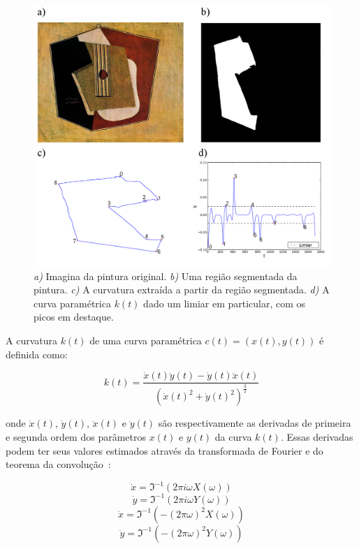 \begin{figure}[h!]
\begin{center}
        \includegraphics[width=\columnwidth]{figs/curvatura}
      \caption{\textit{a)} Imagina da pintura original. \textit{b)} Uma região
        segmentada da pintura. \textit{c)} A curvatura extraída a partir
        da região segmentada. \textit{d)} A curva paramétrica $k(t)$ dado um
        limiar em particular, com os picos em destaque.}
        \label{fig:curvatura}
\end{center}
\end{figure}

A curvatura $k(t)$ de uma curva paramétrica $c(t) = (x(t), y(t))$ é definida como:

\begin{equation}
k(t) = \frac{\dot{x}(t)\ddot{y}(t)-\dot{y}(t)\ddot{x}(t)} {(\dot{x}(t)^2+\dot{y}(t)^2)^\frac{3}{2}}
\label{eq:curvatura}
\end{equation}

\noindent onde $\dot{x}(t)$, $\dot{y}(t)$, $\ddot{x}(t)$ e
$\ddot{y}(t)$ são respectivamente as derivadas de primeira e segunda
ordem dos parâmetros $x(t)$ e $y(t)$ da curva $k(t)$. Essas derivadas
podem ter seus valores estimados através da transformada de Fourier e
do teorema da convolução~\cite{papoulis}:

\begin{equation}
\dot{x} = \Im^{-1}(2\pi i \omega X(\omega))
\end{equation}
\begin{equation}
\dot{y} = \Im^{-1}(2\pi i \omega Y(\omega))
\end{equation}
\begin{equation}
\ddot{x} = \Im^{-1}(-(2\pi\omega)^2 X(\omega))
\end{equation}
\begin{equation}
\ddot{y} = \Im^{-1}(-(2\pi\omega)^2 Y(\omega))
\end{equation}

